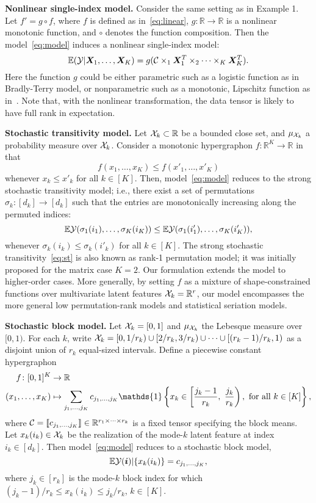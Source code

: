 \documentclass{article}
\theoremstyle{plain}
\theoremstyle{definition}
\begin{document}
{\bf Nonlinear single-index model.} Consider the same setting as in Example 1. Let $f'=g\circ f$, where $f$ is defined as in~\eqref{eq:linear}, $g\colon \mathbb{R}\to\mathbb{R}$ is a nonlinear monotonic function, and $\circ$ denotes the function composition. Then the model~\eqref{eq:model} induces a nonlinear single-index model:
\[
\mathbb{E}(\mathcal{Y}|\bm X_1,\ldots,\bm X_K)=g(\mathcal{C}\times_1\bm X_1^T\times_2\cdots\times_K\bm X^T_K).
\]
Here the function $g$ could be either parametric such as a logistic function as in Bradly-Terry model, or nonparametric such as a monotonic, Lipschitz function as in~\cite{ganti2015matrix}. Note that, with the nonlinear transformation, the data tensor is likely to have full rank in expectation. 


{\bf Stochastic transitivity model.} Let $\mathcal{X}_k\subset\mathbb{R}$ be a bounded close set, and $\mu_{\mathcal{X}_k}$ a probability measure over $\mathcal{X}_k$. Consider a monotonic hypergraphon $f\colon \mathbb{R}^K\to \mathbb{R}$ in that 
\[
f(x_1,\ldots,x_K)\leq f(x'_1,\ldots,x'_K)
\]
whenever $x_k\leq x'_k$ for all $k\in[K]$. Then, model~\eqref{eq:model} reduces to the strong stochastic transitivity model; i.e., there exist a set of permutations $\sigma_k\colon[d_k]\to[d_k]$ such that the entries are monotonically increasing along the permuted indices:
\begin{equation}\label{eq:st}
\mathbb{E}\mathcal{Y}(\sigma_1(i_1),\ldots,\sigma_K(i_K)) \leq \mathbb{E}\mathcal{Y}(\sigma_1(i'_1),\ldots,\sigma_K(i'_K)),
\end{equation}
whenever $\sigma_k(i_k)\leq \sigma_k(i'_k)$ for all $k\in[K].$ The strong stochastic transitivity~\eqref{eq:st} is also known as rank-1 permutation model; it was initially proposed for the matrix case $K=2$. Our formulation extends the model to higher-order cases. More generally, by setting $f$ as a mixture of shape-constrained functions over multivariate latent features $\mathcal{X}_k=\mathbb{R}^r$, our model encompasses the more general low permutation-rank models and statistical seriation models. 


{\bf Stochastic block model.} Let $\mathcal{X}_k=[0,1]$ and $\mu_{\mathcal{X}_k}$ the Lebesque measure over $[0,1)$. For each $k$, write $\mathcal{X}_k=[0,1/r_k)\cup [2/r_k, 3/r_k) \cup \cdots \cup [(r_k-1)/r_k, 1)$ as a disjoint union of $r_k$ equal-sized intervals. Define a piecewise constant hypergraphon
\begin{align}\label{eq:block}
f\colon [0,1]^K &\to \mathbb{R}\\
(x_1,\ldots,x_K) &\mapsto \sum_{j_1,\ldots,j_K} c_{j_1,\ldots,j_K} \mathds{1}\left\{x_k\in \left[{j_k-1\over r_k},\ {j_k\over r_k}\right),\ \text{for all }k\in[K]\right\},
\end{align}
where $\mathcal{C}=\llbracket c_{j_1,\ldots,j_K} \rrbracket\in\mathbb{R}^{r_1\times \cdots \times r_k}$ is a fixed tensor specifying the block means. Let $x_k(i_k)\in\mathcal{X}_k$ be the realization of the mode-$k$ latent feature at index $i_k\in[d_k]$. Then model~\eqref{eq:model} reduces to a stochastic block model,
\begin{equation}\label{eq:tbm}
\mathbb{E}\mathcal{Y}(\bm{i})|\{x_k(i_k)\}=c_{j_1,\ldots,j_K},
\end{equation}
where $j_k\in[r_k]$ is the mode-$k$ block index for which $(j_k-1)/r_k \leq x_k(i_k)\leq j_k/ r_k$, $k\in[K]$.
\end{document}

